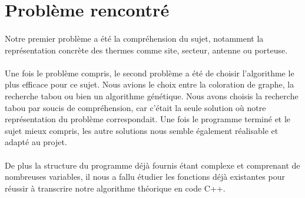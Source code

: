 \section{Problème rencontré}

    \paragraph{}Notre premier problème a été la compréhension du sujet, notamment la représentation
    concrète des thermes comme site, secteur, antenne ou porteuse.

    \paragraph{}Une fois le problème compris, le second problème a été de choisir l'algorithme le
    plus efficace pour ce sujet. Nous avions le choix entre la coloration de graphe, la recherche
    tabou ou bien un algorithme génétique. Nous avons choisis la recherche tabou par soucis de
    compréhension, car c'était la seule solution où notre représentation du problème correspondait. 
    Une fois le programme terminé et le sujet mieux compris, les autre solutions nous semble
    également réalisable et adapté au projet.

    \paragraph{}De plus la structure du programme déjà fournis étant complexe et comprenant de nombreuses
    variables, il nous a fallu étudier les fonctions déjà existantes pour réussir à transcrire notre
    algorithme théorique en code C++.
